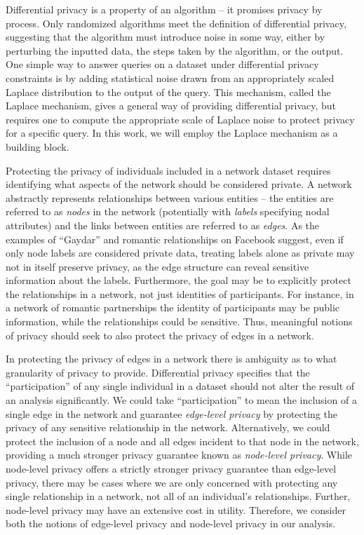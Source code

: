 Differential privacy is a property of an algorithm -- it promises privacy by process. Only randomized algorithms meet the definition of differential privacy, suggesting that the algorithm must introduce noise in some way, either by perturbing the inputted data, the steps taken by the algorithm, or the output. One simple way to answer queries on a dataset under differential privacy constraints is by adding statistical noise drawn from an appropriately scaled Laplace distribution to the output of the query. This mechanism, called the Laplace mechanism, gives a general way of providing differential privacy, but requires one to compute the appropriate scale of Laplace noise to protect privacy for a specific query. In this work, we will employ the Laplace mechanism as a building block.

Protecting the privacy of individuals included in a network dataset requires identifying what aspects of the network should be considered private. A network abstractly represents relationships between various entities -- the entities are referred to as \emph{nodes} in the network (potentially with \emph{labels} specifying nodal attributes) and the links between entities are referred to as \emph{edges}. As the examples of ``Gaydar'' and romantic relationships on Facebook suggest, even if only node labels are considered private data, treating labels alone as private may not in itself preserve privacy, as the edge structure can reveal sensitive information about the labels. Furthermore, the goal may be to explicitly protect the relationships in a network, not just identities of participants. For instance, in a network of romantic partnerships the identity of participants may be public information, while the relationships could be sensitive. Thus, meaningful notions of privacy should seek to also protect the privacy of edges in a network.

In protecting the privacy of edges in a network there is ambiguity as to what granularity of privacy to provide. Differential privacy specifies that the ``participation'' of any single individual in a dataset should not alter the result of an analysis significantly. We could take ``participation'' to mean the inclusion of a single edge in the network and guarantee \emph{edge-level privacy} by protecting the privacy of any sensitive relationship in the network. Alternatively, we could protect the inclusion of a node and all edges incident to that node in the network, providing a much stronger privacy guarantee known as \emph{node-level privacy}. While node-level privacy offers a strictly stronger privacy guarantee than edge-level privacy, there may be cases where we are only concerned with protecting any single relationship in a network, not all of an individual's relationships. Further, node-level privacy may have an extensive cost in utility. Therefore, we consider both the notions of edge-level privacy and node-level privacy in our analysis.

